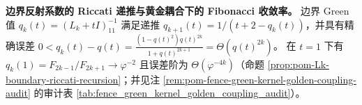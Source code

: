     \item \textbf{边界反射系数的 Riccati 递推与黄金耦合下的 Fibonacci 收敛率。}
    边界 Green 值 \(q_k(t)=(L_k+tI)^{-1}_{11}\) 满足递推
    \(q_{k+1}(t)=1/(t+2-q_k(t))\)，并具有精确误差
    \(
    0<q_k(t)-q(t)=\frac{(1-q(t)^2)q(t)^{2k}}{1+q(t)^{2k+1}}=\Theta(q(t)^{2k})
    \)。
    在 \(t=1\) 下有
    \(q_k(1)=F_{2k-1}/F_{2k+1}\to \varphi^{-2}\)
    且误差阶为 \(\Theta(\varphi^{-4k})\)（命题 \ref{prop:pom-Lk-boundary-riccati-recursion}；并见注 \ref{rem:pom-fence-green-kernel-golden-coupling-audit} 的审计表 \ref{tab:fence_green_kernel_golden_coupling_audit}）。


